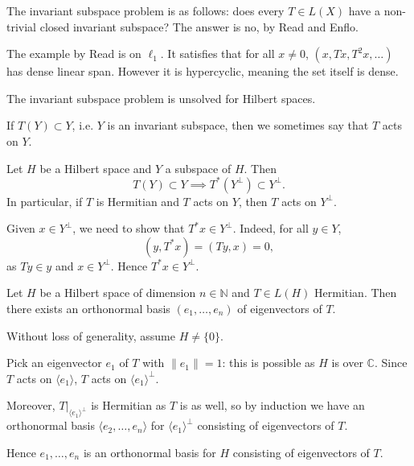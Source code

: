 \documentclass[12pt]{article}
\begin{document}
The invariant subspace problem is as follows: does every $T \in L(X)$ have a non-trivial closed invariant subspace? The answer is no, by Read and Enflo.

The example by Read is on $\ell_1$. It satisfies that for all $x \neq 0$, $(x, Tx, T^2x, \ldots)$ has dense linear span. However it is hypercyclic, meaning the set itself is dense.

The invariant subspace problem is unsolved for Hilbert spaces.


If $T(Y) \subset Y$, i.e. $Y$ is an invariant subspace, then we sometimes say that $T$ acts on $Y$.

\begin{proposition}
	Let $H$ be a Hilbert space and $Y$ a subspace of $H$. Then
	\[
	T(Y) \subset Y \implies T^{\ast}(Y^{\perp}) \subset Y^{\perp}.
	\]
	In particular, if $T$ is Hermitian and $T$ acts on $Y$, then $T$ acts on $Y^{\perp}$.
\end{proposition}

\begin{proofbox}
	Given $x \in Y^{\perp}$, we need to show that $T^{\ast}x \in Y^{\perp}$. Indeed, for all $y \in Y$,
	\[
		(y, T^{\ast} x) = (Ty, x) = 0,
	\]
	as $Ty \in y$ and $x \in Y^{\perp}$. Hence $T^{\ast}x \in Y^{\perp}$.
\end{proofbox}

\begin{corollary}
	Let $H$ be a Hilbert space of dimension $n \in \mathbb{N}$ and $T \in L(H)$ Hermitian. Then there exists an orthonormal basis $(e_1, \ldots, e_n)$ of eigenvectors of $T$.
\end{corollary}

\begin{proofbox}
	Without loss of generality, assume $H \neq \{0\}$.

	Pick an eigenvector $e_1$ of $T$ with $\|e_1\| = 1$: this is possible as $H$ is over $\mathbb{C}$. Since $T$ acts on $\langle e_1 \rangle$, $T$ acts on $\langle e_1 \rangle^{\perp}$.

	Moreover, $T|_{\langle e_1 \rangle^{\perp}}$ is Hermitian as $T$ is as well, so by induction we have an orthonormal basis $\langle e_2, \ldots, e_n\rangle$ for $\langle e_1 \rangle^{\perp}$ consisting of eigenvectors of $T$.

	Hence $e_1, \ldots, e_n$ is an orthonormal basis for $H$ consisting of eigenvectors of $T$.
\end{proofbox}
\end{document}
